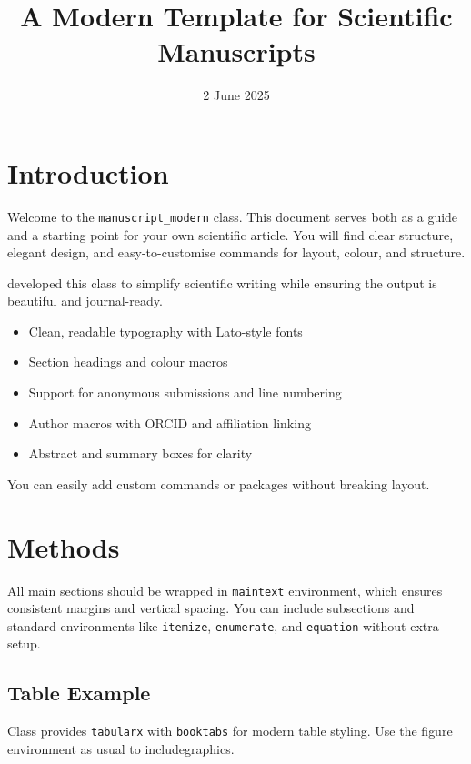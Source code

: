 \documentclass{manuscript_modern}
\title{A Modern Template for Scientific Manuscripts}
\date{2 June 2025}
\begin{document}
	
	\maketitleblock
	
	\section{Introduction}
	\begin{maintext}
		Welcome to the \texttt{manuscript\_modern} class. This document serves both as a guide and a starting point for your own scientific article. You will find clear structure, elegant design, and easy-to-customise commands for layout, colour, and structure.
		
		\We{} developed this class to simplify scientific writing while ensuring the output is beautiful and journal-ready.
		
		\begin{itemize}
			\item Clean, readable typography with Lato-style fonts
			\item Section headings and colour macros
			\item Support for anonymous submissions and line numbering
			\item Author macros with ORCID and affiliation linking
			\item Abstract and summary boxes for clarity
		\end{itemize}
		
		You can easily add custom commands or packages without breaking layout.
	
	\begin{summaryblock}
	\end{summaryblock}
	
	\section{Methods}

		All main sections should be wrapped in \texttt{maintext} environment, which ensures consistent margins and vertical spacing. You can include subsections and standard environments like \texttt{itemize}, \texttt{enumerate}, and \texttt{equation} without extra setup.
		
		\subsection{Table Example}
		Class provides \texttt{tabularx} with \texttt{booktabs} for modern table styling. Use the figure environment as usual to includegraphics.
		

\end{maintext}
\end{document}
